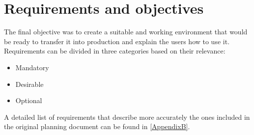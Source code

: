\section{Requirements and objectives}
	The final objective was to create a suitable and working environment that would be ready to transfer it into production and explain the users how to use it.\\
	Requirements can be divided in three categories based on their relevance:
	\begin{itemize}
		\item Mandatory
		\item Desirable
		\item Optional
	\end{itemize}
	A detailed list of requirements that describe more accurately the ones included in the original planning document can be found in \ref{AppendixB}.
	
